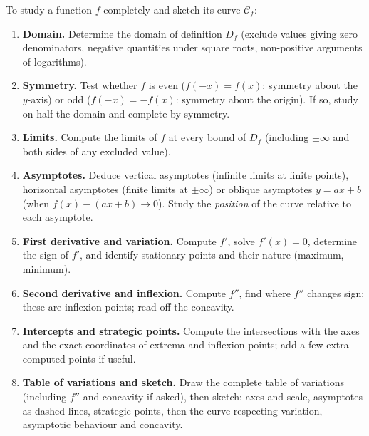 \documentclass[11pt]{article}
\begin{document}
\begin{methode}
To study a function $f$ completely and sketch its curve $\mathcal{C}_f$:
\begin{enumerate}
\item \textbf{Domain.} Determine the domain of definition $D_f$ (exclude values giving zero denominators, negative quantities under square roots, non-positive arguments of logarithms).
\item \textbf{Symmetry.} Test whether $f$ is even ($f(-x)=f(x)$: symmetry about the $y$-axis) or odd ($f(-x)=-f(x)$: symmetry about the origin). If so, study on half the domain and complete by symmetry.
\item \textbf{Limits.} Compute the limits of $f$ at every bound of $D_f$ (including $\pm\infty$ and both sides of any excluded value).
\item \textbf{Asymptotes.} Deduce vertical asymptotes (infinite limits at finite points), horizontal asymptotes (finite limits at $\pm\infty$) or oblique asymptotes $y=ax+b$ (when $f(x)-(ax+b)\to 0$). Study the \emph{position} of the curve relative to each asymptote.
\item \textbf{First derivative and variation.} Compute $f'$, solve $f'(x)=0$, determine the sign of $f'$, and identify stationary points and their nature (maximum, minimum).
\item \textbf{Second derivative and inflexion.} Compute $f''$, find where $f''$ changes sign: these are inflexion points; read off the concavity.
\item \textbf{Intercepts and strategic points.} Compute the intersections with the axes and the exact coordinates of extrema and inflexion points; add a few extra computed points if useful.
\item \textbf{Table of variations and sketch.} Draw the complete table of variations (including $f''$ and concavity if asked), then sketch: axes and scale, asymptotes as dashed lines, strategic points, then the curve respecting variation, asymptotic behaviour and concavity.
\end{enumerate}
\end{methode}
\end{document}
